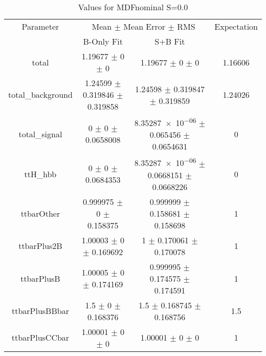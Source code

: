 \begin{table}
\centering
\caption{Values for MDFnominal S=0.0}
\begin{tabular}{cccc}
\toprule
Parameter & \multicolumn{2}{c}{Mean $\pm$ Mean Error $\pm$ RMS} & Expectation\\
 & B-Only Fit & S+B Fit & \\
\midrule
total & \num{1.19677} $\pm$ \num{0} $\pm$ \num{0} & \num{1.19677} $\pm$ \num{0} $\pm$ \num{0} & \num{1.16606}\\
total\_background & \num{1.24599} $\pm$ \num{0.319846} $\pm$ \num{0.319858} & \num{1.24598} $\pm$ \num{0.319847} $\pm$ \num{0.319859} & \num{1.24026}\\
total\_signal & \num{0} $\pm$ \num{0} $\pm$ \num{0.0658008} & \num{8.35287e-06} $\pm$ \num{0.065456} $\pm$ \num{0.0654631} & \num{0}\\
ttH\_hbb & \num{0} $\pm$ \num{0} $\pm$ \num{0.0684353} & \num{8.35287e-06} $\pm$ \num{0.0668151} $\pm$ \num{0.0668226} & \num{0}\\
ttbarOther & \num{0.999975} $\pm$ \num{0} $\pm$ \num{0.158375} & \num{0.999999} $\pm$ \num{0.158681} $\pm$ \num{0.158698} & \num{1}\\
ttbarPlus2B & \num{1.00003} $\pm$ \num{0} $\pm$ \num{0.169692} & \num{1} $\pm$ \num{0.170061} $\pm$ \num{0.170078} & \num{1}\\
ttbarPlusB & \num{1.00005} $\pm$ \num{0} $\pm$ \num{0.174169} & \num{0.999995} $\pm$ \num{0.174575} $\pm$ \num{0.174591} & \num{1}\\
ttbarPlusBBbar & \num{1.5} $\pm$ \num{0} $\pm$ \num{0.168376} & \num{1.5} $\pm$ \num{0.168745} $\pm$ \num{0.168756} & \num{1.5}\\
ttbarPlusCCbar & \num{1.00001} $\pm$ \num{0} $\pm$ \num{0} & \num{1.00001} $\pm$ \num{0} $\pm$ \num{0} & \num{1}\\
\bottomrule
\end{tabular}
\end{table}